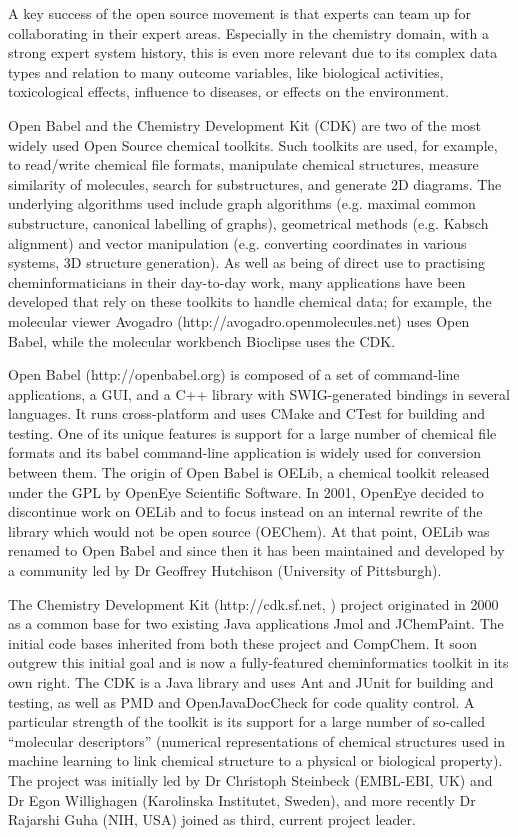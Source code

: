\documentclass{sig-alternate}
\begin{document}
A key success of the open source movement is that experts can team up for
collaborating in their expert areas. Especially in the chemistry domain, with a
strong expert system history, this is even more relevant due to its complex data
types and relation to many outcome variables, like biological activities,
toxicological effects, influence to diseases, or effects on the environment.

Open Babel and the Chemistry Development Kit (CDK) are two of the most widely
used Open Source chemical toolkits. Such toolkits are used, for example, to
read/write chemical file formats, manipulate chemical structures, measure
similarity of molecules, search for substructures, and generate 2D diagrams. The
underlying algorithms used include graph algorithms (e.g. maximal common
substructure, canonical labelling of graphs), geometrical methods (e.g. Kabsch
alignment) and vector manipulation (e.g. converting coordinates in various
systems, 3D structure generation). As well as being of direct use to practising
cheminformaticians in their day-to-day work, many applications have been
developed that rely on these toolkits to handle chemical data; for example, the
molecular viewer Avogadro (http://avogadro.openmolecules.net) uses Open Babel,
while the molecular workbench Bioclipse \cite{Bioclipse2} uses the CDK.
 
Open Babel (http://openbabel.org) is composed of a set of command-line
applications, a GUI, and a C++ library with SWIG-generated bindings in several
languages. It runs cross-platform and uses CMake and CTest for building and
testing. One of its unique features is support for a large number of chemical
file formats and its babel command-line application is widely used for
conversion between them. The origin of Open Babel is OELib, a chemical toolkit
released under the GPL by OpenEye Scientific Software. In 2001, OpenEye decided
to discontinue work on OELib and to focus instead on an internal rewrite of the
library which would not be open source (OEChem). At that point, OELib was
renamed to Open Babel and since then it has been maintained and developed by a
community led by Dr Geoffrey Hutchison (University of Pittsburgh).

The Chemistry Development Kit (http://cdk.sf.net, \cite{Steinbeck2006}) project
originated in 2000 as a common base for two existing Java applications Jmol and
JChemPaint. The initial code bases inherited from both these project and
CompChem. It soon outgrew this initial goal and is now a fully-featured
cheminformatics toolkit in its own right. The CDK is a Java library and uses Ant
and JUnit for building and testing, as well as PMD and OpenJavaDocCheck for code
quality control. A particular strength of the toolkit is its support for a large
number of so-called “molecular descriptors” (numerical representations of
chemical structures used in machine learning to link chemical structure to a
physical or biological property). The project was initially led by Dr Christoph
Steinbeck (EMBL-EBI, UK) and Dr Egon Willighagen (Karolinska Institutet,
Sweden), and more recently Dr Rajarshi Guha (NIH, USA) joined as third, current
project leader.
\end{document}
